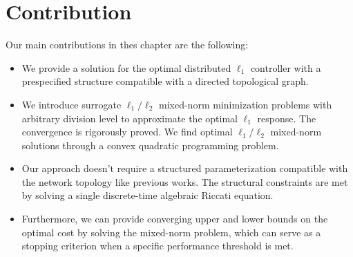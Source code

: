 \section{Contribution}
Our main contributions in thes chapter are the following:
\begin{itemize}
    \item We provide a solution for the optimal distributed \(\ell_1\) controller with a prespecified structure compatible with a directed topological graph.
    \item We introduce surrogate \(\ell_1/\ell_2\) mixed-norm minimization problems with arbitrary division level to approximate the optimal \(\ell_1\) response. The convergence is rigorously proved. We find optimal \(\ell_1/\ell_2\) mixed-norm solutions through a convex quadratic programming problem. 
    \item Our approach doesn't require a structured parameterization compatible with the network topology like previous works. The structural constraints are met by solving a single discrete-time algebraic Riccati equation.
    \item Furthermore, we can provide converging upper and lower bounds on the optimal cost by solving the mixed-norm problem, which can serve as a stopping criterion when a specific performance threshold is met.  
\end{itemize}




  




